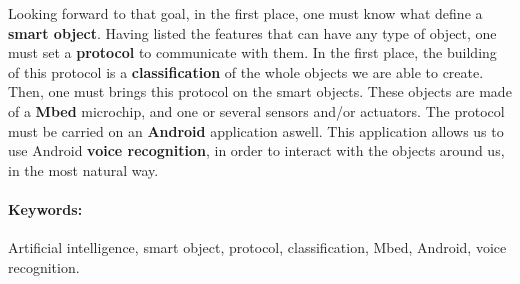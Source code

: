 Looking forward to that goal, in the first place, one must know what define a \textbf{smart object}. Having listed the features that can have any type of object, one must set a \textbf{protocol} to communicate with them. In the first place, the building of this protocol is a \textbf{classification} of the whole objects we are able to create. Then, one must brings this protocol on the smart objects. These objects are made of a \textbf{Mbed} microchip, and one or several sensors and/or actuators. The protocol must be carried on an \textbf{Android} application aswell. This application allows us to use Android \textbf{voice recognition}, in order to interact with the objects around us, in the most natural way.
 
   \paragraph{Keywords:}Artificial intelligence, smart object, protocol, classification, Mbed, Android, voice recognition.
